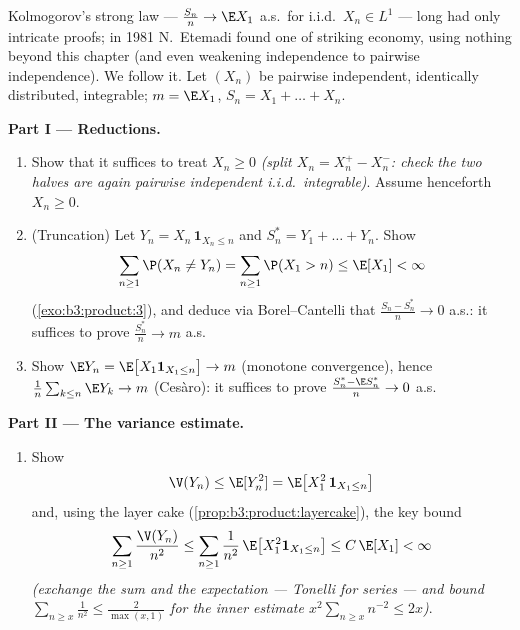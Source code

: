 \begin{problem}
\label{pb:b3:probability:1}
Kolmogorov's strong law --- $\frac{S_n}n \to \E X_1$ a.s.\
for i.i.d.\ $X_n \in L^1$ --- long had only intricate proofs;
in 1981 N.~Etemadi found one of striking economy, using
nothing beyond this chapter (and even weakening independence
to pairwise independence). We follow it. Let $(X_n)$ be
pairwise independent, identically distributed, integrable;
$m = \E X_1$, $S_n = X_1 + \dots + X_n$.

\medskip
\noindent\textbf{Part I --- Reductions.}
\begin{enumerate}
  \item Show that it suffices to treat $X_n \geq 0$
        \emph{(split $X_n = X_n^+ - X_n^-$: check the two
        halves are again pairwise independent i.i.d.\
        integrable)}. Assume henceforth $X_n \geq 0$.
  \item (Truncation) Let $Y_n = X_n\,\mathbf 1_{X_n \leq n}$
        and $S_n^* = Y_1 + \dots + Y_n$. Show
        \[
        \sum_{n\geq1}\P(X_n \neq Y_n) =
        \sum_{n\geq1}\P(X_1 > n) \leq \E[X_1] < \infty
        \]
        (\cref{exo:b3:product:3}), and deduce via
        Borel--Cantelli that $\frac{S_n - S_n^*}{n} \to 0$
        a.s.: it suffices to prove $\frac{S^*_n}n \to m$
        a.s.
  \item Show $\E Y_n = \E\bigl[X_1\mathbf 1_{X_1\leq
        n}\bigr] \to m$ (monotone convergence), hence
        $\frac1n\sum_{k\leq n}\E Y_k \to m$ (Ces\`aro): it
        suffices to prove $\frac{S_n^* - \E S_n^*}{n} \to 0$
        a.s.
\end{enumerate}

\medskip
\noindent\textbf{Part II --- The variance estimate.}
\begin{enumerate}[resume]
  \item Show
        \[
        \V(Y_n) \leq \E[Y_n^2] = \E\bigl[X_1^2\,\mathbf
        1_{X_1 \leq n}\bigr]
        \]
        and, using the layer cake
        (\cref{prop:b3:product:layercake}), the key bound
        \[
        \sum_{n\geq1}\frac{\V(Y_n)}{n^2}
        \leq \sum_{n\geq1}\frac1{n^2}\,
        \E\bigl[X_1^2\mathbf 1_{X_1\leq n}\bigr]
        \leq C\,\E[X_1] < \infty
        \]
        \emph{(exchange the sum and the expectation ---
        Tonelli for series --- and bound $\sum_{n \geq
        x}\frac1{n^2} \leq \frac2{\max(x,1)}$ for the inner
        estimate $x^2\sum_{n\geq x}n^{-2} \leq 2x$)}.
\end{enumerate}


\end{problem}
